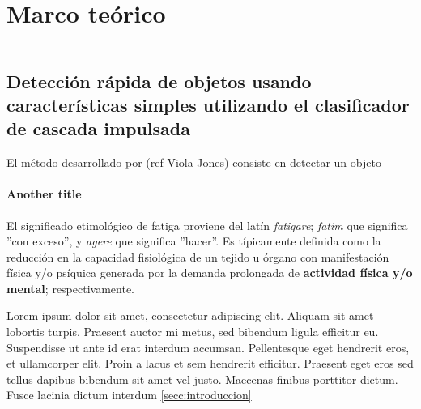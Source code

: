 \chapter{Marco te\'orico}\label{capit:cap2}
\vspace{-2.0325ex}%
\noindent
\rule{\textwidth}{0.5pt}
\vspace{-5.5ex}%
\newcommand{\pushline}{\Indp}%

\section{Detección rápida de objetos usando características simples utilizando el clasificador de cascada impulsada}\label{secc:Detecci\'on r\'apida de objetos}

El m\'etodo  desarrollado por (ref Viola Jones) consiste en detectar un objeto 
 
\subsubsection{Another title}\label{secc:fatiga}
El significado etimológico de fatiga proviene del latín \textit{fatigare}; \textit{fatim} que significa ''con exceso'', y \textit{agere} que significa ''hacer''. Es típicamente definida como la reducción en la capacidad fisiológica de un tejido u órgano con manifestación física y/o psíquica generada por la demanda prolongada de \textbf{actividad física y/o mental}; respectivamente.

Lorem ipsum dolor sit amet, consectetur adipiscing elit. Aliquam sit amet lobortis turpis. Praesent auctor mi metus, sed bibendum ligula efficitur eu. Suspendisse ut ante id erat interdum accumsan. Pellentesque eget hendrerit eros, et ullamcorper elit. Proin a lacus et sem hendrerit efficitur. Praesent eget eros sed tellus dapibus bibendum sit amet vel justo. Maecenas finibus porttitor dictum. Fusce lacinia dictum interdum \ref{secc:introduccion}

